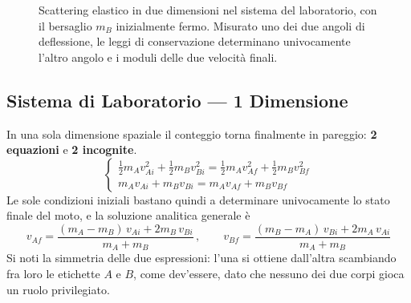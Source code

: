 \begin{figure}[ht]
    \centering
    \caption{Scattering elastico in due dimensioni nel sistema del laboratorio, con il bersaglio $m_B$ inizialmente fermo. Misurato uno dei due angoli di deflessione, le leggi di conservazione determinano univocamente l'altro angolo e i moduli delle due velocità finali.}
    \label{fig:scattering_2d}
\end{figure}

\subsection{Sistema di Laboratorio --- 1 Dimensione}

In una sola dimensione spaziale il conteggio torna finalmente in pareggio: \textbf{2 equazioni} e \textbf{2 incognite}.
\begin{equation}
\begin{cases}
    \tfrac{1}{2} m_A v_{Ai}^2 + \tfrac{1}{2} m_B v_{Bi}^2
        = \tfrac{1}{2} m_A v_{Af}^2 + \tfrac{1}{2} m_B v_{Bf}^2 \\[4pt]
    m_A v_{Ai} + m_B v_{Bi} = m_A v_{Af} + m_B v_{Bf}
\end{cases}
\end{equation}
Le sole condizioni iniziali bastano quindi a determinare univocamente lo stato finale del moto, e la soluzione analitica generale è
\begin{equation}
    v_{Af} = \frac{(m_A - m_B)\,v_{Ai} + 2m_B \,v_{Bi}}{m_A + m_B}
    \, , \qquad
    v_{Bf} = \frac{(m_B - m_A)\,v_{Bi} + 2m_A \,v_{Ai}}{m_A + m_B}
\end{equation}
Si noti la simmetria delle due espressioni: l'una si ottiene dall'altra scambiando fra loro le etichette $A$ e $B$, come dev'essere, dato che nessuno dei due corpi gioca un ruolo privilegiato.


